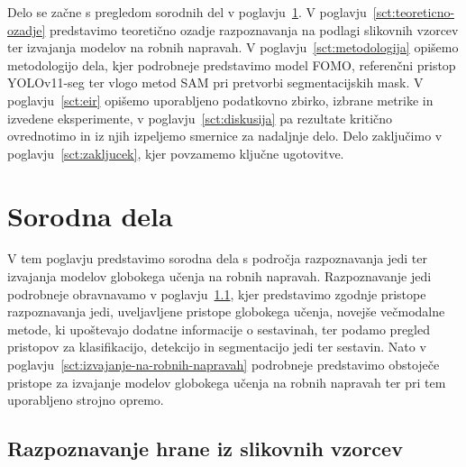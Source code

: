 \documentclass[a4paper,twoside,openright,12pt,slovene]{book}
\begin{document}
    Delo se začne s pregledom sorodnih del v
    poglavju~\ref{sct:sorodna-dela}. V
    poglavju~\ref{sct:teoreticno-ozadje}
    predstavimo teoretično ozadje razpoznavanja
    na podlagi slikovnih vzorcev ter izvajanja modelov na robnih napravah. V
    poglavju~\ref{sct:metodologija} opišemo
    metodologijo dela, kjer podrobneje predstavimo model FOMO, referenčni
    pristop YOLOv11-seg ter vlogo metod SAM pri pretvorbi segmentacijskih mask.
    V poglavju~\ref{sct:eir} opišemo
    uporabljeno podatkovno zbirko, izbrane metrike in izvedene eksperimente, v
    poglavju~\ref{sct:diskusija} pa rezultate kritično
    ovrednotimo in iz njih izpeljemo smernice za nadaljnje delo. Delo
    zaključimo v poglavju~\ref{sct:zakljucek}, kjer
    povzamemo ključne ugotovitve.

\chapter{Sorodna dela} \label{sct:sorodna-dela}

    V tem poglavju predstavimo sorodna dela s področja razpoznavanja jedi ter
    izvajanja modelov globokega učenja na robnih napravah. Razpoznavanje jedi
    podrobneje obravnavamo v
    poglavju~\ref{sct:razpoznavanje-jedi-na-slikah},
    kjer predstavimo zgodnje pristope razpoznavanja jedi, uveljavljene pristope
    globokega učenja, novejše večmodalne metode, ki upoštevajo dodatne
    informacije o sestavinah, ter podamo pregled pristopov za klasifikacijo,
    detekcijo in segmentacijo jedi ter sestavin. Nato v
    poglavju~\ref{sct:izvajanje-na-robnih-napravah}
    podrobneje predstavimo obstoječe pristope za izvajanje modelov globokega
    učenja na robnih napravah ter pri tem uporabljeno strojno opremo.

    \section{Razpoznavanje hrane iz slikovnih vzorcev} \label{sct:razpoznavanje-jedi-na-slikah}
\end{document}
